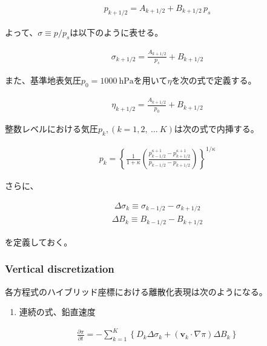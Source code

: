 \begin{eqnarray}
p_{k+1/2} = A_{k+1/2} +B_{k+1/2}\,p_s
\end{eqnarray}

よって、\(\sigma\equiv p/p_s\)は以下のように表せる。

\begin{eqnarray}
\sigma_{k+1/2} = \frac{A_{k+1/2}}{p_s} +B_{k+1/2}
\end{eqnarray}

また、基準地表気圧\(p_0=1000\ \mathrm{hPa}\)を用いて\(\eta\)を次の式で定義する。

\begin{eqnarray}
\eta_{k+1/2} = \frac{A_{k+1/2}}{p_0} +B_{k+1/2}
\end{eqnarray}

整数レベルにおける気圧\(p_k, (k=1,2,\ \ldots\ K)\)は次の式で内挿する。

\begin{eqnarray}
 p_k = \left\{ \frac{1}{1+\kappa}
                     \left( \frac{  p^{\kappa +1}_{k-1/2}
                                  - p^{\kappa +1}_{k+1/2}      }
                                  { p_{k-1/2} - p_{k+1/2} }
                     \right)
              \right\}^{1/\kappa}
\end{eqnarray}

さらに、

\begin{eqnarray}
  \Delta\sigma_k \equiv \sigma_{k-1/2} - \sigma_{k+1/2}
\end{eqnarray} \begin{eqnarray}
  \Delta B_k \equiv B_{k-1/2} - B_{k+1/2}
\end{eqnarray}

を定義しておく。

\hypertarget{vertical-discretization-1}{%
\subsubsection{Vertical
discretization}\label{vertical-discretization-1}}

各方程式のハイブリッド座標における離散化表現は次のようになる。

\begin{enumerate}
\def\labelenumi{\arabic{enumi}.}
\tightlist
\item
  連続の式、鉛直速度
\end{enumerate}

\begin{eqnarray}
  \frac{\partial \pi}{\partial t}
 = - \sum_{k=1}^{K} \left\{ D_k \Delta\sigma_k + ({\mathbf{v}}_k \cdot \nabla \pi)\Delta B_k \right\}
\end{eqnarray}

